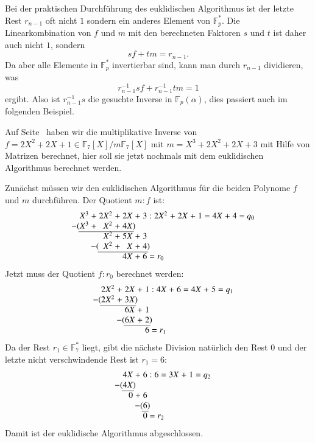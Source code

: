 Bei der praktischen Durchführung des euklidischen Algorithmus ist der 
letzte Rest $r_{n-1}$ oft nicht $1$ sondern ein anderes Element von
$\mathbb{F}_p^*$.
Die Linearkombination von $f$ und $m$ mit den berechneten Faktoren
$s$ und $t$ ist daher auch nicht $1$, sondern 
\[
sf+tm=r_{n-1}.
\]
Da aber alle Elemente in $\mathbb{F}_p^*$ invertierbar sind, kann man
durch $r_{n-1}$ dividieren, was
\[
r_{n-1}^{-1}sf+r_{n-1}^{-1}tm=1
\]
ergibt.
Also ist $r_{n-1}^{-1}s$ die gesuchte Inverse in $\mathbb{F}_p(\alpha)$,
dies passiert auch im folgenden Beispiel.

\begin{beispiel}
Auf 
Seite~\pageref{buch:endlichekoerper:beispiel:inversemitmatrix}
haben wir die multiplikative Inverse von
$f=2X^2+2X+1\in\mathbb{F}_7[X]/m\mathbb{F}_7[X]$ 
mit $m = X^3 + 2X^2 + 2X + 3$
mit Hilfe von Matrizen berechnet, hier soll sie jetzt nochmals
mit dem euklidischen Algorithmus berechnet werden.

Zunächst müssen wir den euklidischen Algorithmus für die beiden Polynome
$f$ und $m$ durchführen.
Der Quotient $m:f$ ist:
\[
\arraycolsep=1.4pt
\begin{array}{rcrcrcrcrcrcrcrcr}
  X^3&+&2X^2&+&2X&+&3&:&2X^2&+&2X&+&1&=&4X&+&4\rlap{$\mathstrut=q_0$}\\
\llap{$-($}X^3&+& X^2&+&4X\rlap{$)$}& & & &    & &  & & & &  & & \\ \cline{1-5}
     & & X^2&+&5X&+&3& &    & &  & & & &  & & \\
     &&\llap{$-(\phantom{2}$}X^2&+& X&+&4\rlap{$)$}& &    & &  & & & &  & & \\ \cline{3-7}
     & &    & &4X&+&6\rlap{$\mathstrut=r_0$}& &    & &  & & & &  & &
\end{array}
\]
Jetzt muss der Quotient $f:r_0$ berechnet werden:
\[
\arraycolsep=1.4pt
\begin{array}{rcrcrcrcrcrcrcrcr}
  2X^2&+&2X&+&1&:&4X&+&6&=&4X&+&5\rlap{$\mathstrut=q_1$}\\
\llap{$-($}2X^2&+&3X\rlap{$)$}& & & &  & & & &  \\ \cline{1-3}
      & &6X&+&1& &  & & & &  \\
      & &\llap{$-($}6X&+&2\rlap{$)$}& &  & & & &  \\ \cline{3-5}
      & &  & &6\rlap{$\mathstrut=r_1$}& & & &  & & & &
\end{array}
\]
Da der Rest $r_1\in\mathbb{F}_7^*$ liegt, gibt die nächste Division
natürlich den Rest $0$ und der letzte nicht verschwindende Rest ist
$r_{1}=6$:
\[
\arraycolsep=1.4pt
\begin{array}{rcrcrcrcr}
4X&+&6&:&6&=&3X&+&1\rlap{$\mathstrut=q_2$} \\
\llap{$-($}4X\rlap{$)$}& & & & & &  & &  \\ \cline{1-1}
 0&+&6& & & &  & & \\
  & &\llap{$-($}6\rlap{$)$}& & & &  & &\\ \cline{3-3}
  & &0\rlap{$\mathstrut=r_2$}& & & &  & &
\end{array}
\]
Damit ist der euklidische Algorithmus abgeschlossen.


\end{beispiel}
